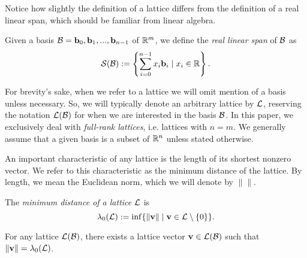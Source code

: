 \documentclass[a4paper,12pt]{article}
\begin{document}
Notice how slightly the definition of a lattice differs from the definition of a real linear span, which should be familiar from linear algebra. 

\begin{defn}
Given a basis $\mathcal{B} = \mathbf{b}_0, \mathbf{b}_1, ... , \mathbf{b}_{n-1}$ of $\mathbb{R}^m$, we define the \textit{real linear span} of $\mathcal{B}$ as $$\mathcal{S}(\mathcal{B}) := \left\{ \sum_{i=0}^{n-1} x_{i}\mathbf{b}_{i} \mid x_{i} \in \mathbb{R} \right\}.$$ 
\end{defn}

For brevity's sake, when we refer to a lattice we will omit mention of a basis unless necessary. So, we will typically denote an arbitrary lattice by $\mathcal{L}$, reserving the notation $\mathcal{L}(\mathcal{B})$ for when we are interested in the basis $\mathcal{B}$. In this paper, we exclusively deal with \textit{full-rank lattices}, i.e. lattices with $n=m$. We generally assume that a given basis is a subset of $\mathbb{R}^n$ unless stated otherwise.

An important characteristic of any lattice is the length of its shortest nonzero vector. We refer to this characteristic as the minimum distance of the lattice. By length, we mean the Euclidean norm, which we will denote by $\| \|$.

\begin{defn}\label{minimum distance of lattice}
The \textit{minimum distance of a lattice} $\mathcal{L}$ is
$$\lambda_{0}(\mathcal{L}) := \inf\lbrace \| \mathbf{v} \| \mid \mathbf{v} \in \mathcal{L} \setminus \lbrace 0 \rbrace \rbrace.$$
\end{defn}

\begin{thm}
For any lattice $\mathcal{L}(\mathcal{B})$, there exists a lattice vector $\mathbf{v} \in \mathcal{L}(\mathcal{B})$ such that $\| \mathbf{v} \| = \lambda_{0}(\mathcal{L})$.
\end{thm}
\end{document}
